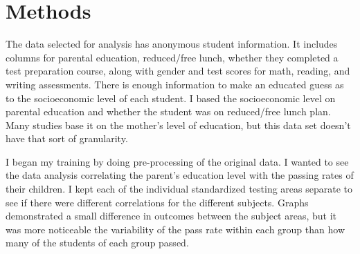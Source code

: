 \documentclass[fleqn,10pt]{olplainarticle}
\begin{document}
\section*{Methods}
The data selected for analysis has anonymous student information. It includes columns for parental education, reduced/free lunch, whether they completed a test preparation course, along with gender and test scores for math, reading, and writing assessments. There is enough information to make an educated guess as to the socioeconomic level of each student. I based the socioeconomic level on parental education and whether the student was on reduced/free lunch plan.  Many studies base it on the mother's level of education, but this data set doesn't have that sort of granularity. \citep{maternaleducation}

I began my training by doing pre-processing of the original data. I wanted to see the data analysis correlating the parent's education level with the passing rates of their children. I kept each of the individual standardized testing areas separate to see if there were different correlations for the different subjects. Graphs demonstrated a small difference in outcomes between the subject areas, but it was more noticeable the variability of the pass rate within each group than how many of the students of each group passed.
\end{document}
